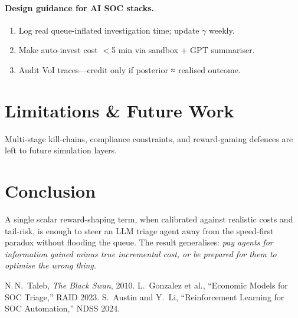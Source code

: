 \documentclass[11pt]{article}
\begin{document}
\paragraph{Design guidance for AI SOC stacks.}
\begin{enumerate}
\item Log real queue-inflated investigation time; update $\gamma$ weekly.
\item Make auto-invest cost $<$5 min via sandbox + GPT summariser.
\item Audit VoI traces—credit only if posterior ≈ realised outcome.
\end{enumerate}

\section{Limitations \& Future Work}
Multi-stage kill-chains, compliance constraints, and reward-gaming
defences are left to future simulation layers.

\section{Conclusion}
A single scalar reward-shaping term,
when calibrated against realistic costs and tail-risk,
is enough to steer an LLM triage agent away from the speed-first paradox
without flooding the queue.
The result generalises: \emph{pay agents for information gained minus
true incremental cost, or be prepared for them to optimise the wrong thing.}


\begin{thebibliography}{9}
 N.\,N.~Taleb, \emph{The Black Swan}, 2010.
 L.~Gonzalez et al., ``Economic Models for SOC Triage,'' RAID 2023.
 S.~Austin and Y.~Li, ``Reinforcement Learning for SOC Automation,'' NDSS 2024.
\end{thebibliography}
\end{document}
